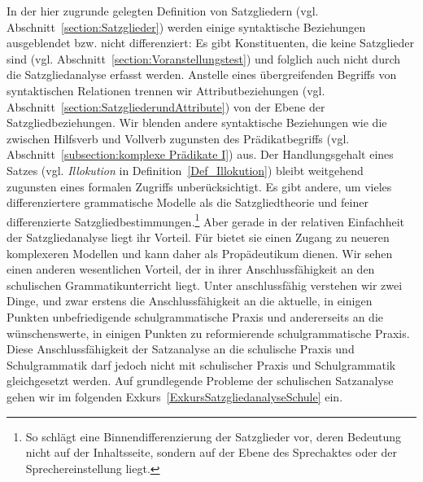 In der hier zugrunde gelegten Definition von Satzgliedern (vgl. Abschnitt~\ref{section:Satzglieder}) werden einige syntaktische Beziehungen ausgeblendet bzw. nicht differenziert: Es gibt Konstituenten, die keine Satzglieder sind (vgl. Abschnitt~\ref{section:Voranstellungstest}) und folglich auch nicht durch die Satzgliedanalyse erfasst werden. Anstelle eines übergreifenden Begriffs von syntaktischen Relationen trennen wir Attributbeziehungen (vgl. Abschnitt~\ref{section:SatzgliederundAttribute}) von der Ebene der Satzgliedbeziehungen. Wir blenden andere syntaktische Beziehungen wie die zwischen Hilfsverb und Vollverb zugunsten des Prädikatbegriffs (vgl. Abschnitt~\ref{subsection:komplexe Prädikate I}) aus. Der Handlungsgehalt eines Satzes (vgl. \textit{Illokution} in Definition~\ref{Def_Illokution}) bleibt weitgehend zugunsten eines formalen Zugriffs unberücksichtigt. Es gibt andere, um vieles differenziertere grammatische Modelle als die Satzgliedtheorie und feiner differenzierte Satzgliedbestimmungen.\footnote{So schlägt \citet[100--106]{Hennig2010SGEbene} eine Binnendifferenzierung der Satzglieder vor, deren Bedeutung nicht auf der Inhaltsseite, sondern auf der Ebene des Sprechaktes oder der Sprechereinstellung liegt.} Aber gerade in der relativen Einfachheit der Satzgliedanalyse liegt ihr Vorteil. Für \citet[VII]{Welke2007} bietet sie einen Zugang zu neueren komplexeren Modellen und kann daher als Propädeutikum dienen. Wir sehen einen anderen wesentlichen Vorteil, der in ihrer Anschlussfähigkeit an den schulischen Grammatikunterricht liegt. Unter anschlussfähig verstehen wir zwei Dinge, und zwar erstens die Anschlussfähigkeit an die aktuelle, in einigen Punkten unbefriedigende schulgrammatische Praxis und andererseits an die wünschenswerte, in einigen Punkten zu reformierende schulgrammatische Praxis. Diese Anschlussfähigkeit der Satzanalyse an die schulische Praxis und Schulgrammatik darf jedoch nicht mit schulischer Praxis und Schulgrammatik gleichgesetzt werden. Auf grundlegende Probleme der schulischen Satzanalyse gehen wir im folgenden Exkurs~\ref{ExkursSatzgliedanalyseSchule} ein.


